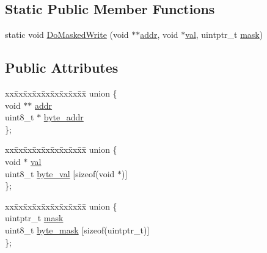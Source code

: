 \subsection*{Static Public Member Functions}
\begin{DoxyCompactItemize}
\item 
static void \hyperlink{structstm_1_1ByteLoggingUndoLogEntry_ab1d7900a36d80fe4cf8eda27b9e27fac}{Do\-Masked\-Write} (void $\ast$$\ast$\hyperlink{structstm_1_1ByteLoggingUndoLogEntry_add3c3d6f73859b45df061b3847939440}{addr}, void $\ast$\hyperlink{structstm_1_1ByteLoggingUndoLogEntry_a04ff02f94131a3ed589024795c13f28a}{val}, uintptr\-\_\-t \hyperlink{structstm_1_1ByteLoggingUndoLogEntry_a20d84801f239a2fe816d0cb64360b914}{mask})
\end{DoxyCompactItemize}
\subsection*{Public Attributes}
\begin{DoxyCompactItemize}
\item 
\begin{tabbing}
xx\=xx\=xx\=xx\=xx\=xx\=xx\=xx\=xx\=\kill
union \{\\
\>void $\ast$$\ast$ \hyperlink{structstm_1_1ByteLoggingUndoLogEntry_add3c3d6f73859b45df061b3847939440}{addr}\\
\>uint8\_t $\ast$ \hyperlink{structstm_1_1ByteLoggingUndoLogEntry_a21b0197017fb1bcee1e3714bc9cc6841}{byte\_addr}\\
\}; \\

\end{tabbing}\item 
\begin{tabbing}
xx\=xx\=xx\=xx\=xx\=xx\=xx\=xx\=xx\=\kill
union \{\\
\>void $\ast$ \hyperlink{structstm_1_1ByteLoggingUndoLogEntry_a04ff02f94131a3ed589024795c13f28a}{val}\\
\>uint8\_t \hyperlink{structstm_1_1ByteLoggingUndoLogEntry_aea8c8f8cbb3a681a7199d8b55eb37593}{byte\_val} \mbox{[}sizeof(void $\ast$)\mbox{]}\\
\}; \\

\end{tabbing}\item 
\begin{tabbing}
xx\=xx\=xx\=xx\=xx\=xx\=xx\=xx\=xx\=\kill
union \{\\
\>uintptr\_t \hyperlink{structstm_1_1ByteLoggingUndoLogEntry_a20d84801f239a2fe816d0cb64360b914}{mask}\\
\>uint8\_t \hyperlink{structstm_1_1ByteLoggingUndoLogEntry_aaf3fc6fb3291d9acd7a879e0a5deff75}{byte\_mask} \mbox{[}sizeof(uintptr\_t)\mbox{]}\\
\}; \\

\end{tabbing}\end{DoxyCompactItemize}
